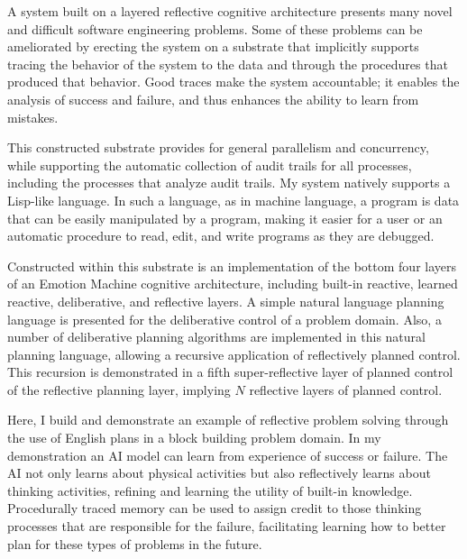 A system built on a layered reflective cognitive architecture presents
many novel and difficult software engineering problems.  Some of these
problems can be ameliorated by erecting the system on a substrate that
implicitly supports tracing the behavior of the system to the data and
through the procedures that produced that behavior.  Good traces make
the system accountable; it enables the analysis of success and
failure, and thus enhances the ability to learn from mistakes.

This constructed substrate provides for general parallelism and
concurrency, while supporting the automatic collection of audit trails
for all processes, including the processes that analyze audit trails.
My system natively supports a Lisp-like language.  In such a language,
as in machine language, a program is data that can be easily
manipulated by a program, making it easier for a user or an automatic
procedure to read, edit, and write programs as they are debugged.

Constructed within this substrate is an implementation of the bottom
four layers of an Emotion Machine cognitive architecture, including
built-in reactive, learned reactive, deliberative, and reflective
layers.  A simple natural language planning language is presented for
the deliberative control of a problem domain.  Also, a number of
deliberative planning algorithms are implemented in this natural
planning language, allowing a recursive application of reflectively
planned control.  This recursion is demonstrated in a fifth
super-reflective layer of planned control of the reflective planning
layer, implying $N$ reflective layers of planned control.

Here, I build and demonstrate an example of reflective problem solving
through the use of English plans in a block building problem domain.
In my demonstration an AI model can learn from experience of success
or failure.  The AI not only learns about physical activities but also
reflectively learns about thinking activities, refining and learning
the utility of built-in knowledge.  Procedurally traced memory can be
used to assign credit to those thinking processes that are responsible
for the failure, facilitating learning how to better plan for these
types of problems in the future.
